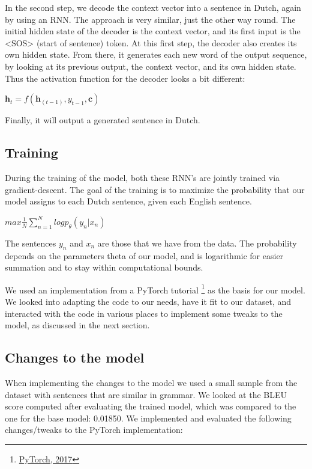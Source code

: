 \documentclass[11pt]{article}
\begin{document}
In the second step, we decode the context vector into a sentence in Dutch, again by using an RNN. The approach is very similar, just the other way round. The initial hidden state of the decoder is the context vector, and its first input is the <SOS> (start of sentence) token. At this first step, the decoder also creates its own hidden state. From there, it generates each new word of the output sequence, by looking at its previous output, the context vector, and its own hidden state. Thus the activation function for the decoder looks a bit different: 
\begin{center}
    $\textbf{h}_t = f(\textbf{h}_{(t-1)},y_{t-1},\textbf{c})$
\end{center} 
Finally, it will output a generated sentence in Dutch.

\subsection{Training}
During the training of the model, both these RNN’s are jointly trained via gradient-descent. The goal of the training is to maximize the probability that our model assigns to each Dutch sentence, given each English sentence. 
\begin{center}
    $max \frac{1}{N} \sum_{n=1}^{N} logp_{\theta}(y_n|x_n)$
\end{center}
The sentences $y_{n}$ and $x_{n}$ are those that we have from the data. The probability depends on the parameters theta of our model, and is logarithmic for easier summation and to stay within computational bounds.

We used an implementation from a PyTorch tutorial \footnote[6]{\href{https://pytorch.org/tutorials/intermediate/seq2seq_translation_tutorial.html}{PyTorch, 2017}} as the basis for our model. We looked into adapting the code to our needs, have it fit to our dataset, and interacted with the code in various places to implement some tweaks to the model, as discussed in the next section.

\subsection{Changes to the model}
When implementing the changes to the model we used a small sample from the dataset with sentences that are similar in grammar. We looked at the BLEU score computed after evaluating the trained model, which was compared to the one for the base model: 0.01850. We implemented and evaluated the following changes/tweaks to the PyTorch implementation:
\end{document}
